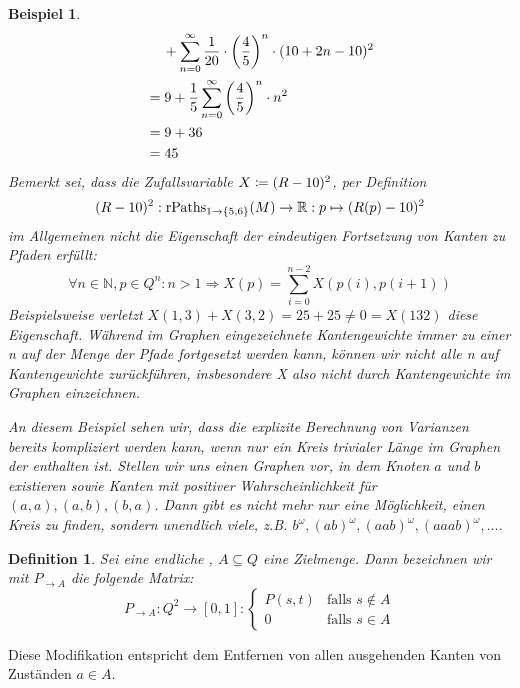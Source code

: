 \documentclass[a4paper]{article}
\newtheorem{beispiel}[satz]{Beispiel}
\newtheorem{definition}[satz]{Definition} %
\theoremstyle{nonumberplain}
\begin{document}
\begin{beispiel}
\begin{align*}
		& \hspace{1.2em} + \sum_{n = 0}^{\infty}{\frac{1}{20}\cdot\left(\frac{4}{5}\right)^n \cdot (10 + 2n - 10)^2} \\
		& = 9 + \frac{1}{5}\sum_{n = 0}^{\infty}{\left(\frac{4}{5}\right)^n \cdot n^2} \\
		& = 9 + 36 \\
		& = 45
	\end{align*}
	Bemerkt sei, dass die Zufallsvariable $X \coloneqq (R-10)^2$, per Definition
	\[
	(R-10)^2 : \mathrm{rPaths}_{1 \rightarrow \{5,6\}}(M) \to  \mathbb{R} : p \mapsto (R(p) - 10)^2
	\]
	im Allgemeinen nicht die Eigenschaft der eindeutigen Fortsetzung von Kanten zu Pfaden erfüllt:
	\[
	\forall n \in \mathbb{N}, p \in Q^n : n>1 \Rightarrow X(p) = \sum_{i=0}^{n-2}{X(p(i),p(i+1))}
	\]
	Beispielsweise verletzt $X(1,3) + X(3,2) = 25 + 25 \neq 0 = X(132)$ diese Eigenschaft. Während im Graphen eingezeichnete Kantengewichte immer zu einer \rvar{}n auf der Menge der Pfade fortgesetzt werden kann, können wir nicht alle \rvar{}n auf Kantengewichte zurückführen, insbesondere X also nicht durch Kantengewichte im Graphen einzeichnen.
	
	
	An diesem Beispiel sehen wir, dass die explizite Berechnung von Varianzen bereits kompliziert werden kann, wenn nur ein Kreis trivialer Länge im Graphen der \mc{} enthalten ist. Stellen wir uns einen Graphen vor, in dem Knoten $a$ und $b$ existieren sowie Kanten mit positiver Wahrscheinlichkeit für $(a,a), (a,b), (b,a)$. Dann gibt es nicht mehr nur eine Möglichkeit, einen Kreis zu finden, sondern unendlich viele, z.B. $b^\omega, (ab)^\omega, (aab)^\omega, (aaab)^\omega, \dots$\;.
\end{beispiel}

\begin{definition}\label{def-pmod}
	Sei \mcex{} eine endliche \mc, $A\subseteq Q$ eine Zielmenge. Dann bezeichnen wir mit $P_{\rightarrow A}$ die folgende Matrix:
	\begin{equation}
	P_{\rightarrow A} : Q^2 \to [0,1] : \begin{cases}
	P(s,t) & \text{falls } s\notin A\\
	0 & \text{falls } s\in A
	\end{cases}
	\end{equation}
\end{definition}

Diese Modifikation entspricht dem Entfernen von allen ausgehenden Kanten von Zuständen $a\in A$.
\end{document}

